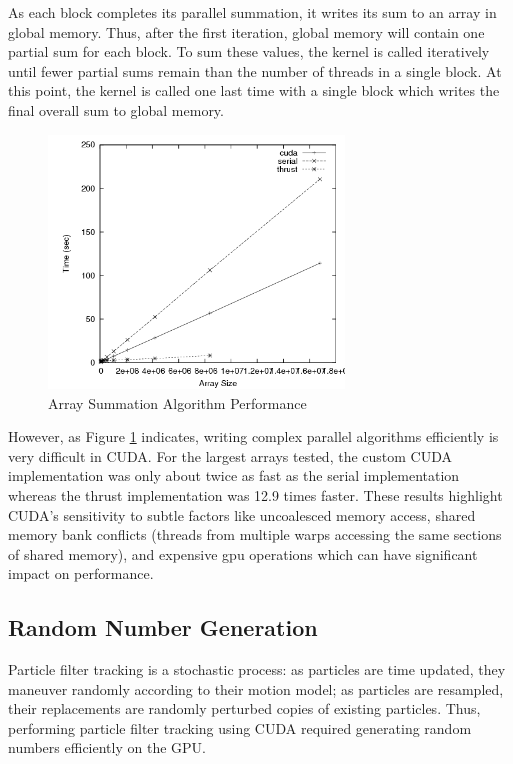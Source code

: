 \documentclass{article}
\begin{document}
As each block completes its parallel summation, it writes its sum to an array in global memory. Thus, after the first iteration, global memory will contain one partial sum for each block. To sum these values, the kernel is called iteratively until fewer partial sums remain than the number of threads in a single block. At this point, the kernel is called one last time with a single block which writes the final overall sum to global memory.

\begin{figure}
\centering
\includegraphics[width=0.7\textwidth]{data/summation_plot.png}
\caption{Array Summation Algorithm Performance}
\label{summation_plot}
\end{figure}

However, as Figure \ref{summation_plot} indicates, writing complex parallel algorithms efficiently is very difficult in CUDA. For the largest arrays tested, the custom CUDA implementation was only about twice as fast as the serial implementation whereas the thrust implementation was 12.9 times faster. These results highlight CUDA's sensitivity to subtle factors like uncoalesced memory access, shared memory bank conflicts (threads from multiple warps accessing the same sections of shared memory), and expensive gpu operations which can have significant impact on performance.\cite{bestprac}

\subsection{Random Number Generation}
Particle filter tracking is a stochastic process: as particles are time updated, they maneuver randomly according to their motion model; as particles are resampled, their replacements are randomly perturbed copies of existing particles. Thus, performing particle filter tracking using CUDA required generating random numbers efficiently on the GPU.
\end{document}
